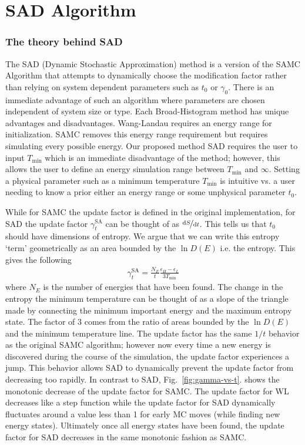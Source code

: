 \documentclass[letterpaper,twocolumn,amsmath,amssymb,pre,aps,10pt]{revtex4-1}
\begin{document}
\section{SAD Algorithm}
\subsubsection{The theory behind SAD}
The SAD (Dynamic Stochastic Approximation) method is a version of the SAMC
Algorithm that attempts to dynamically choose the modification factor
rather than relying on system dependent parameters such as $t_0$ or
$\gamma_0$.  There is an immediate advantage of such an algorithm where
parameters are chosen independent of system size or type. Each
Broad-Histogram method has unique advantages and disadvantages.
Wang-Landau requires an energy range for initialization.  SAMC removes
this energy range requirement but requires simulating every possible
energy. Our proposed method SAD requires the user to input
$T_\text{min}$ which is an immediate disadvantage of the method;
however, this allows the user to define an energy simulation
range between $T_\text{min}$ and $\infty$. Setting a physical parameter
such as a minimum temperature $T_\text{min}$ is intuitive vs. a user
needing to know a prior either an energy range or some unphysical
parameter $t_0$.

While for SAMC the update factor is defined in the original
implementation, for SAD the update factor $\gamma_{t}^{\text{SA}}$ can
be thought of as $\nicefrac{\text{d}S}{\text{d}t}$. This tells us that
$t_0$ should have dimensions of entropy.  We argue that we can write
this entropy `term' geometrically as an area bounded by the $\ln{D(E)}$
i.e. the entropy. This gives the following
\begin{align}
\gamma_{t}^{\text{SA}} =
\frac{N_E}{t}\frac{\epsilon_{H}-\epsilon_{L}}{3T_{\text{min}}}
\end{align}
where $N_E$ is the number of energies that have been found. The change
in the entropy the minimum temperature can be thought of as a slope of
the triangle made by connecting the minimum important energy and the
maximum entropy state.  The factor of $3$ comes from the ratio of areas
bounded by the $\ln{D(E)}$ and the minimum temperature line. The update
factor has the same $1/t$ behavior as the original SAMC algorithm;
however now every time a new energy is discovered during the course of
the simulation, the update factor experiences a jump. This behavior
allows SAD to dynamically prevent the update factor from decreasing too
rapidly. In contrast to SAD, Fig.~\ref{fig:gamma-vs-t}. shows the
monotonic decrease of the update factor for SAMC.  The update factor
for WL decreases like a step function while the update factor for SAD
dynamically fluctuates around a value less than 1 for early MC moves
(while finding new energy states).  Ultimately once all energy states
have been found, the update factor for SAD decreases in the same
monotonic fashion as SAMC.
\end{document}
